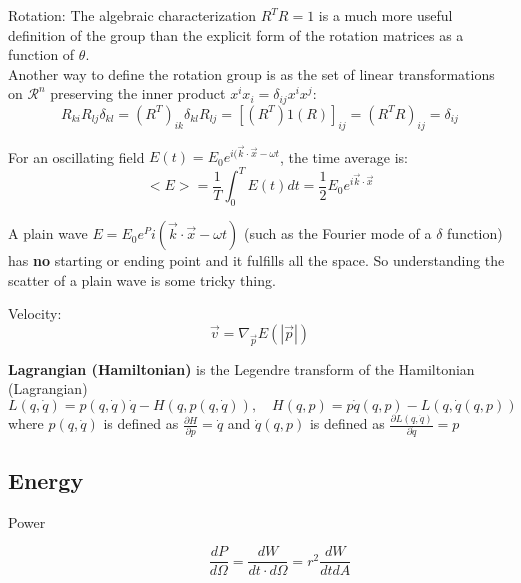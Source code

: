Rotation:
The algebraic characterization $R^TR=\mathcal{1}$ is a much more useful
definition of the group than the explicit form of the rotation matrices 
as a function of $\theta$.  \\
Another way to define the rotation group is as the set of linear 
transformations on $\mathcal{R}^n$ preserving the inner product 
$x^ix_i=\delta_{ij}x^ix^j$:
\begin{equation}
    \label{eqn:rotation}
    R_{ki}R_{lj}\delta_{kl} = (R^T)_{ik}\delta_{kl}R_{lj} = [(R^T)\mathcal{1}(R)]_{ij} = (R^TR)_{ij}=\delta_{ij}
\end{equation}

For an oscillating field $E(t) = E_0 e^{i(\vec{k}\cdot\vec{x}-\omega t}$, the time average is:
\begin{equation}
    <E> = \frac{1}{T}\int_0^TE(t)dt = \frac{1}{2}E_0e^{i\vec{k}\cdot\vec{x}}
\end{equation}

A plain wave $E = E_0 e^Pi(\vec{k}\cdot\vec{x}-\omega t)$ (such as the Fourier mode
of a $\delta$ function) has \textbf{no} starting or ending point and it fulfills
all the space. So understanding the scatter of a plain wave is some tricky thing.

Velocity: 
\begin{equation}
    \vec{v} = \nabla_{\vec{p}}E(|\vec{p}|)
\end{equation}

\textbf{Lagrangian (Hamiltonian)} is the Legendre transform of the Hamiltonian (Lagrangian)
\begin{equation}
    L(q, \dot{q}) = p(q, \dot{q})\dot{q} - H(q,p(q, \dot{q})), \quad 
    H(q, p) = p\dot{q}(q,p) - L(q,\dot{q}(q,p))
\end{equation}
where $p(q, \dot{q})$ is defined as $\frac{\partial H}{\partial p} = \dot{q}$
and $\dot{q}(q,p)$ is defined as $\frac{\partial L(q,\dot{q})}{\partial \dot{q}}=p$
\subsection{Energy}
\begin{description}
    \item [Power]
	\begin{equation}
	    \frac{dP}{d\Omega} = \frac{dW}{dt\cdot d\Omega} = r^2\frac{dW}{dt dA}
	\end{equation}
\end{description}

